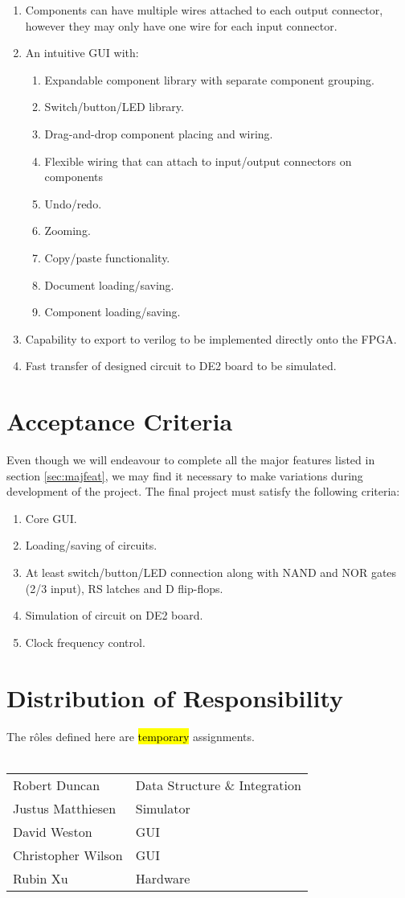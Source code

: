 \documentclass[12pt, a4paper, oneside,titlepage]{article}
\begin{document}
\begin{enumerate}
\item Components can have multiple wires attached to each output connector, however they may only have one wire for each input connector.  
\item An intuitive GUI with:  \begin{enumerate}
						\item Expandable component library with separate component grouping.
						\item Switch/button/LED library. 
						\item Drag-and-drop component placing and wiring.
					    \item Flexible wiring that can attach to input/output connectors on components
					    \item Undo/redo.
					    	\item Zooming.
						 \item Copy/paste functionality.
						\item Document loading/saving.
						\item Component loading/saving.
						\end{enumerate}
\item Capability to export to verilog to be implemented directly onto the FPGA.
\item Fast transfer of designed circuit to DE2 board to be simulated.
\end{enumerate}

\section{Acceptance Criteria}
Even though we will endeavour to complete all the major features listed in section \ref{sec:majfeat}, we may find it necessary to make variations during development of the project. The final project must satisfy the following criteria:
\begin{enumerate}
\item Core GUI.
\item Loading/saving of circuits.
\item At least switch/button/LED connection along with NAND and NOR gates (2/3 input), RS latches and D flip-flops.
\item Simulation of circuit on DE2 board.
\item Clock frequency control.
\end{enumerate}

\section{Distribution of Responsibility}
The r\^oles defined here are \hl{temporary} assignments. \\ \\ 
\begin{tabular}{l l}
Robert Duncan & Data Structure \& Integration\\ 
Justus Matthiesen & Simulator \\
David Weston & GUI \\
Christopher Wilson & GUI \\
Rubin Xu & Hardware \\
\end{tabular}
\end{document}
